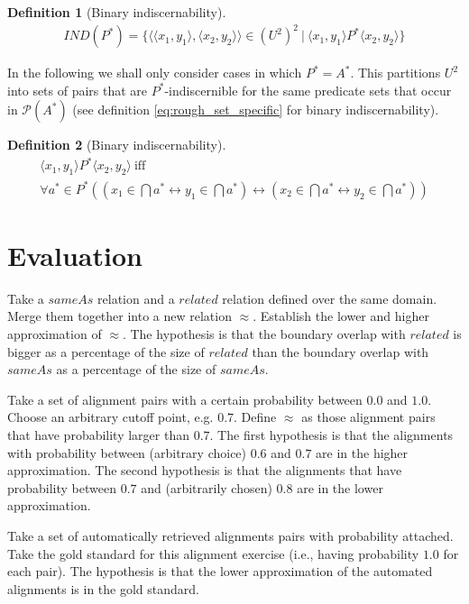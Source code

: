 \documentclass[11pt,a4paper,notitlepage,onecolumn,twoside]{article}
\newtheorem{definition}{Definition}
\begin{document}
\begin{definition}[Binary indiscernability]
\begin{align}
\label{eq:rough_set_specific}
IND(P^*) = \{
  \langle
    \langle x_1, y_1 \rangle,
    \langle x_2, y_2 \rangle
  \rangle \in (U^2)^2
\  \vert \ 
  \langle x_1, y_1 \rangle P^* \langle x_2, y_2 \rangle
\}
\end{align}
\end{definition}

In the following we shall only consider cases in which $P^* = A^*$. This partitions $U^2$ into sets of pairs that are $P^*$-indiscernible for the same predicate sets that occur in $\mathcal{P}(A^*)$ (see definition \ref{eq:rough_set_specific} for binary indiscernability).

\begin{definition}[Binary indiscernability]
\begin{align}
\label{eq:rough_set_r}
\langle x_1, y_1 \rangle P^* \langle x_2, y_2 \rangle \  \text{iff} \  \\
  \forall a^* \in P^* (
    (x_1 \in \bigcap a^* \leftrightarrow y_1 \in \bigcap a^*)
  \leftrightarrow
    (x_2 \in \bigcap a^* \leftrightarrow y_2 \in \bigcap a^*)
  )
\end{align}
\end{definition}

\section{Evaluation}
\label{sec:evaluation}

Take a $sameAs$ relation and a $related$ relation defined over the same domain. Merge them together into a new relation $\approx$. Establish the lower and higher approximation of $\approx$. The hypothesis is that the boundary overlap with $related$ is bigger as a percentage of the size of $related$ than the boundary overlap with $sameAs$ as a percentage of the size of $sameAs$.

Take a set of alignment pairs with a certain probability between $0.0$ and $1.0$. Choose an arbitrary cutoff point, e.g. $0.7$. Define $\approx$ as those alignment pairs that have probability larger than $0.7$. The first hypothesis is that the alignments with probability between (arbitrary choice) $0.6$ and $0.7$ are in the higher approximation. The second hypothesis is that the alignments that have probability between $0.7$ and (arbitrarily chosen) $0.8$ are in the lower approximation.

Take a set of automatically retrieved alignments pairs with probability attached. Take the gold standard for this alignment exercise (i.e., having probability $1.0$ for each pair). The hypothesis is that the lower approximation of the automated alignments is in the gold standard.
\end{document}
